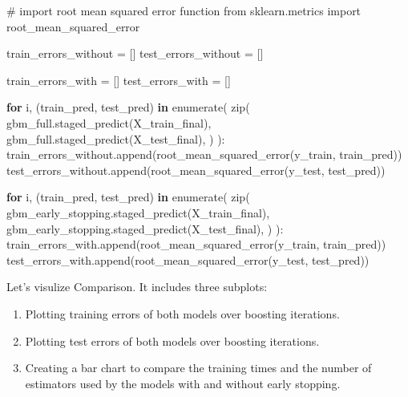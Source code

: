 \documentclass[
  letterpaper,
  DIV=11,
  numbers=noendperiod]{scrreprt}
\newenvironment{Shaded}{\begin{snugshade}}{\end{snugshade}}
\newcommand{\BuiltInTok}[1]{\textcolor[rgb]{0.00,0.23,0.31}{#1}}
\newcommand{\CommentTok}[1]{\textcolor[rgb]{0.37,0.37,0.37}{#1}}
\newcommand{\ControlFlowTok}[1]{\textcolor[rgb]{0.00,0.23,0.31}{\textbf{#1}}}
\newcommand{\ImportTok}[1]{\textcolor[rgb]{0.00,0.46,0.62}{#1}}
\newcommand{\KeywordTok}[1]{\textcolor[rgb]{0.00,0.23,0.31}{\textbf{#1}}}
\newcommand{\NormalTok}[1]{\textcolor[rgb]{0.00,0.23,0.31}{#1}}
\newcommand{\OperatorTok}[1]{\textcolor[rgb]{0.37,0.37,0.37}{#1}}
\providecommand{\tightlist}{%
  \setlength{\itemsep}{0pt}\setlength{\parskip}{0pt}}\usepackage{longtable,booktabs,array}
\begin{document}
\begin{Shaded}
\begin{Highlighting}[]
\CommentTok{\# import root mean squared error function}
\ImportTok{from}\NormalTok{ sklearn.metrics }\ImportTok{import}\NormalTok{ root\_mean\_squared\_error}

\NormalTok{train\_errors\_without }\OperatorTok{=}\NormalTok{ []}
\NormalTok{test\_errors\_without }\OperatorTok{=}\NormalTok{ []}

\NormalTok{train\_errors\_with }\OperatorTok{=}\NormalTok{ []}
\NormalTok{test\_errors\_with }\OperatorTok{=}\NormalTok{ []}

\ControlFlowTok{for}\NormalTok{ i, (train\_pred, test\_pred) }\KeywordTok{in} \BuiltInTok{enumerate}\NormalTok{(}
    \BuiltInTok{zip}\NormalTok{(}
\NormalTok{        gbm\_full.staged\_predict(X\_train\_final),}
\NormalTok{        gbm\_full.staged\_predict(X\_test\_final),}
\NormalTok{    )}
\NormalTok{):}
\NormalTok{    train\_errors\_without.append(root\_mean\_squared\_error(y\_train, train\_pred))}
\NormalTok{    test\_errors\_without.append(root\_mean\_squared\_error(y\_test, test\_pred))}

\ControlFlowTok{for}\NormalTok{ i, (train\_pred, test\_pred) }\KeywordTok{in} \BuiltInTok{enumerate}\NormalTok{(}
    \BuiltInTok{zip}\NormalTok{(}
\NormalTok{        gbm\_early\_stopping.staged\_predict(X\_train\_final),}
\NormalTok{        gbm\_early\_stopping.staged\_predict(X\_test\_final),}
\NormalTok{    )}
\NormalTok{):}
\NormalTok{    train\_errors\_with.append(root\_mean\_squared\_error(y\_train, train\_pred))}
\NormalTok{    test\_errors\_with.append(root\_mean\_squared\_error(y\_test, test\_pred))}
\end{Highlighting}
\end{Shaded}

Let's visulize Comparison. It includes three subplots:

\begin{enumerate}
\def\labelenumi{\arabic{enumi}.}
\tightlist
\item
  Plotting training errors of both models over boosting iterations.
\item
  Plotting test errors of both models over boosting iterations.
\item
  Creating a bar chart to compare the training times and the number of
  estimators used by the models with and without early stopping.
\end{enumerate}
\end{document}
